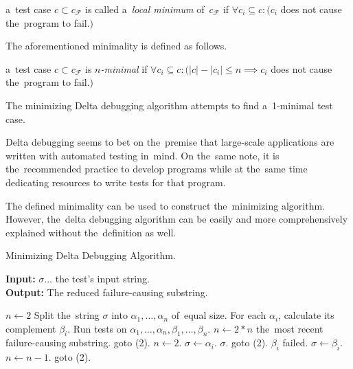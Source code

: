 \begin{defn}\label{def02:3}
  a~test case $c \subset c_\mathcal{F}$ is called a~\emph{local minimum}
  of~$c_\mathcal{F}$ if $\forall c_i \subseteq c:
  (c_i$ does not cause the~program to fail.$)$
\end{defn}

The aforementioned minimality is defined as follows.

\begin{defn}[$n$-minimality]\label{def02:4}
  a~test case $c \subset c_\mathcal{F}$ is \emph{$n$-minimal}
  if $\forall c_i \subseteq c:
  (|c| - |c_i| \leq n \implies c_i$ does not cause the~program to fail.$)$
\end{defn}

The minimizing Delta debugging algorithm attempts to find a~1-minimal test case.

Delta debugging seems to bet on the~premise that large-scale applications are written
with automated testing in~mind. On the~same note, it is the~recommended practice to
develop programs while at the~same time dedicating resources to write tests for that
program.

The defined minimality can be used to construct the~minimizing algorithm. 
However, the~delta debugging algorithm can be easily and more comprehensively explained 
without the~definition as well.


\begin{algorithm}
	\label{alg:dd}
	\caption{Minimizing Delta Debugging Algorithm.} 
	\hspace*{\algorithmicindent} \textbf{Input:} $\sigma \ldots$ the test's input string. \\
	\hspace*{\algorithmicindent} \textbf{Output:} The reduced failure-causing substring. 
	\begin{algorithmic}[1]
		\State $n \leftarrow 2$
		\State Split the~string $\sigma$ into $\alpha_1,\dots,\alpha_n$ of~equal size.
		\State For each $\alpha_i$, calculate its complement $\beta_i$.
		\State Run tests on $\alpha_1,\dots,\alpha_n,\beta_1,\dots,\beta_n$.
			\State $n \leftarrow 2*n$
				\Return the~most recent failure-causing substring.
			\Else
				\State goto (2).
			\EndIf
			\State $n \leftarrow 2$.
			\State $\sigma \leftarrow \alpha_i$.
				\Return $\sigma$.
			\Else
				\State goto (2).
			\EndIf
		\Else
			\Comment $\beta_i$ failed.
			\State $\sigma \leftarrow \beta_i$.
			\State $n \leftarrow n - 1$.
			\State goto (2).
		\EndIf
	\end{algorithmic} 
\end{algorithm}

